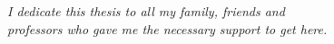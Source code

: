 \begin{dedicatoria}
   \vspace*{\fill}
   \centering
   \noindent
   \textit{I dedicate this thesis to all my family, friends and \\ 
   professors who gave me the necessary support to get here.} \vspace*{\fill}
\end{dedicatoria}
